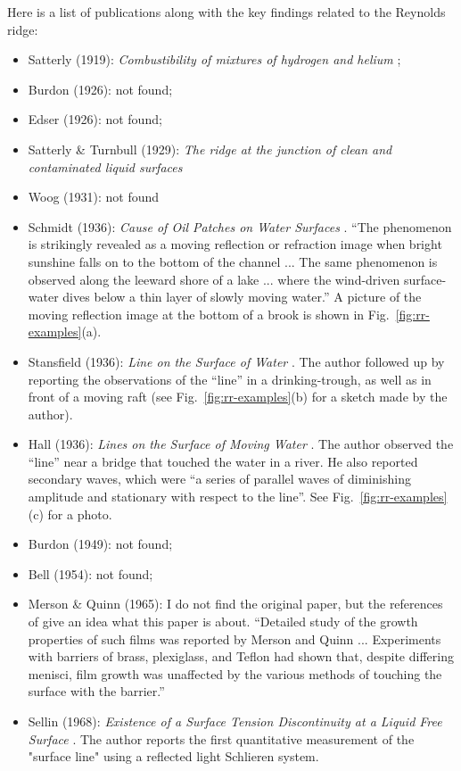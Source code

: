 \documentclass[12pt]{article}
\begin{document}
Here is a list of publications along with the key findings related to the Reynolds ridge:
\begin{itemize}
    \item Satterly (1919): \emph{Combustibility of mixtures of hydrogen and helium} \cite{Satterly1919};
    \item Burdon (1926): not found;
    \item Edser (1926): not found;
    \item Satterly \& Turnbull (1929): \emph{The ridge at the junction of clean and contaminated liquid surfaces} 
    \item Woog (1931): not found
    \item Schmidt (1936): \emph{Cause of Oil Patches on Water Surfaces} \cite{Schmidt1936}. ``The phenomenon is strikingly revealed as a moving reflection or refraction image when bright sunshine falls on to the bottom of the channel ... The same phenomenon is observed along the leeward shore of a lake ... where the wind-driven surface-water dives below a thin layer of slowly moving water.'' A picture of the moving reflection image at the bottom of a brook is shown in Fig.~\ref{fig:rr-examples}(a).
    \item Stansfield (1936): \emph{Line on the Surface of Water} \cite{Stansfield1936}. The author followed up \cite{Schmidt1936} by reporting the observations of the ``line'' in a drinking-trough, as well as in front of a moving raft (see Fig.~\ref{fig:rr-examples}(b) for a sketch made by the author). 
    \item Hall (1936): \emph{Lines on the Surface of Moving Water} \cite{Hall1936}. The author observed the ``line'' near a bridge that touched the water in a river. He also reported secondary waves, which were ``a series of parallel waves of diminishing amplitude and stationary with respect to the line''. See Fig.~\ref{fig:rr-examples}(c) for a photo.
    \item Burdon (1949): not found;
    \item Bell (1954): not found;
    \item Merson \& Quinn (1965): I do not find the original paper, but the references of \cite{Mockros1968} give an idea what this paper is about. ``Detailed study of the growth properties of such films was reported by Merson and Quinn ... Experiments with barriers of brass, plexiglass, and Teflon had shown that, despite differing menisci, film growth was unaffected by the various methods of touching the surface with the barrier.''
    \item Sellin (1968): \emph{Existence of a Surface Tension Discontinuity at a Liquid Free Surface} \cite{Sellin1968}. The author reports the first quantitative measurement of the "surface line" using a reflected light Schlieren system. 

\end{itemize}
\end{document}

